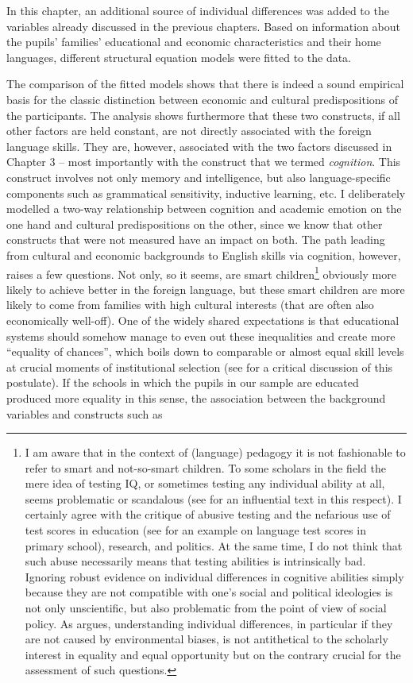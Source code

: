 \documentclass[output=paper]{langsci/langscibook}
\begin{document}
In this chapter, an additional source of individual differences was added to the variables already discussed in the previous chapters. Based on information about the pupils’ families’ educational and economic characteristics and their home languages, different structural equation models were fitted to the data.

The comparison of the fitted models shows that there is indeed a sound empirical basis for the classic distinction between economic and cultural predispositions of the participants. The analysis shows furthermore that these two constructs, if all other factors are held constant, are not directly associated with the foreign language skills. They are, however, associated with the two factors discussed in Chapter 3 -- most importantly with the construct that we termed \textit{cognition}. This construct involves not only memory and intelligence, but also language-specific components such as grammatical sensitivity, inductive learning, etc. I deliberately modelled a two-way relationship between cognition and academic emotion on the one hand and cultural predispositions on the other, since we know that other constructs that were not measured have an impact on both. The path leading from cultural and economic backgrounds to English skills via cognition, however, raises a few questions. Not only, so it seems, are smart children\footnote{I am aware that in the context of (language) pedagogy it is not fashionable to refer to smart and not-so-smart children. To some scholars in the field the mere idea of testing IQ, or sometimes testing any individual ability at all, seems problematic or scandalous (see \citealt[186]{Foucault1975} for an influential text in this respect). I certainly agree with the critique of abusive testing and the nefarious use of test scores in education (see \citealt{KuhnMai2015} for an example on language test scores in primary school), research, and politics. At the same time, I do not think that such abuse necessarily means that testing abilities is intrinsically bad. Ignoring robust evidence on individual differences in cognitive abilities simply because they are not compatible with one’s social and political ideologies is not only unscientific, but also problematic from the point of view of social policy. As \citet[chapter 9]{Plomin2019} argues, understanding individual differences, in particular if they are not caused by environmental biases, is not antithetical to the scholarly interest in equality and equal opportunity but on the contrary crucial for the assessment of such questions.} obviously more likely to achieve better in the foreign language, but these smart children are more likely to come from families with high cultural interests (that are often also economically well-off). One of the widely shared expectations is that educational systems should somehow manage to even out these inequalities and create more ``equality of chances'', which boils down to comparable or almost equal skill levels at crucial moments of institutional selection (see \citealt{Heid1988} for a critical discussion of this postulate). If the schools in which the pupils in our sample are educated produced more equality in this sense, the association between the background variables and constructs such as 
\end{document}
